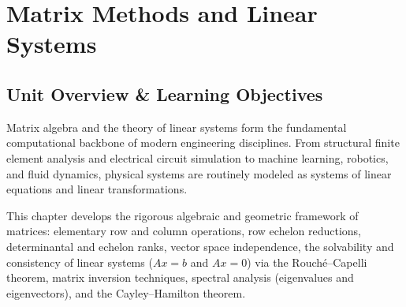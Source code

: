 \chapter{Matrix Methods and Linear Systems}
\label{chap:matrix-methods}

\section{Unit Overview \& Learning Objectives}

Matrix algebra and the theory of linear systems form the fundamental computational backbone of modern engineering disciplines. From structural finite element analysis and electrical circuit simulation to machine learning, robotics, and fluid dynamics, physical systems are routinely modeled as systems of linear equations and linear transformations.

This chapter develops the rigorous algebraic and geometric framework of matrices: elementary row and column operations, row echelon reductions, determinantal and echelon ranks, vector space independence, the solvability and consistency of linear systems ($Ax=b$ and $Ax=0$) via the Rouch\'e--Capelli theorem, matrix inversion techniques, spectral analysis (eigenvalues and eigenvectors), and the Cayley--Hamilton theorem.

